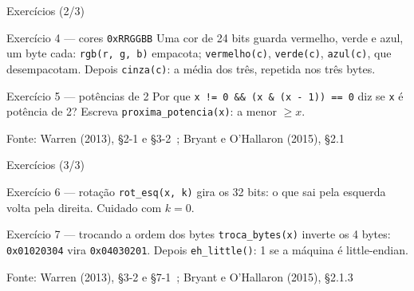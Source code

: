 \documentclass[aspectratio=169]{beamer}
\newcommand{\fonte}[1]{\vfill\hfill{\scriptsize\textcolor{UFSGray}{Fonte: #1}}}
\begin{document}
\begin{frame}{Exercícios (2/3)}
  \vspace{-0.4em}
  \footnotesize
  \begin{block}{Exercício 4 --- cores \texttt{0xRRGGBB}}
    Uma cor de 24 bits guarda vermelho, verde e azul, um byte cada:
    \texttt{rgb(r, g, b)} empacota; \texttt{vermelho(c)},
    \texttt{verde(c)}, \texttt{azul(c)}, que desempacotam. Depois
    \texttt{cinza(c)}: a média dos três, repetida nos três bytes.
  \end{block}
  \begin{block}{Exercício 5 --- potências de 2}
    Por que \texttt{x != 0 \&\& (x \& (x - 1)) == 0} diz se \texttt{x} é
    potência de 2? Escreva \texttt{proxima\_potencia(x)}: a menor $\geq x$.
  \end{block}
  \fonte{Warren (2013), §2-1 e §3-2~\cite{warren2013hackers};
    Bryant e O'Hallaron (2015), §2.1~\cite{bryant2015computer}}
\end{frame}

\begin{frame}{Exercícios (3/3)}
  \footnotesize
  \begin{block}{Exercício 6 --- rotação}
    \texttt{rot\_esq(x, k)} gira os 32 bits: o que sai pela esquerda volta
    pela direita. Cuidado com $k = 0$.
  \end{block}
  \begin{block}{Exercício 7 --- trocando a ordem dos bytes}
    \texttt{troca\_bytes(x)} inverte os 4 bytes: \texttt{0x01020304} vira
    \texttt{0x04030201}. Depois \texttt{eh\_little()}: 1 se a máquina é
    little-endian.
  \end{block}
  \fonte{Warren (2013), §3-2 e §7-1~\cite{warren2013hackers};
    Bryant e O'Hallaron (2015), §2.1.3~\cite{bryant2015computer}}
\end{frame}
\end{document}
